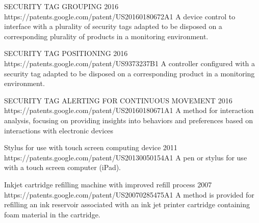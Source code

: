 

\cvpatentevent
{SECURITY TAG GROUPING}
{2016}
{https://patents.google.com/patent/US20160180672A1}
{A device control to interface with a plurality of security tags adapted to be disposed on a corresponding plurality of products in a monitoring environment.}


\cvpatentevent
{SECURITY TAG POSITIONING}
{2016}
{https://patents.google.com/patent/US9373237B1}
{A controller configured with a security tag adapted to be disposed on a corresponding product in a monitoring environment.}


\cvpatentevent
{SECURITY TAG ALERTING FOR CONTINUOUS MOVEMENT}
{2016}
{https://patents.google.com/patent/US20160180671A1}
{A method for interaction analysis, focusing on providing insights into behaviors and preferences based on interactions with electronic devices}


\cvpatentevent
{Stylus for use with touch screen computing device}
{2011}
{https://patents.google.com/patent/US20130050154A1}
{A pen or stylus for use with a touch screen computer (iPad).}


\cvpatentevent
{Inkjet cartridge refilling machine with improved refill process}
{2007}
{https://patents.google.com/patent/US20070285475A1}
{A method is provided for refilling an ink reservoir associated with an ink jet printer cartridge containing foam material in the cartridge.}
